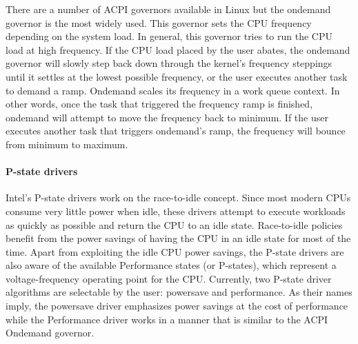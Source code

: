 There are a number of ACPI governors available in Linux but the ondemand governor is the most widely used.
This governor sets the CPU frequency depending on the system load.  
In general, this governor tries to run the CPU load at high frequency. If the CPU load placed by the user abates, the ondemand governor will slowly 
step back down through the kernel's frequency steppings until it settles at the lowest possible frequency, or the user executes another task to demand a ramp.
Ondemand scales its frequency in a work queue context. In other words, once the task that triggered the frequency ramp is finished, 
ondemand will attempt to move the frequency back to minimum. If the user executes another task that triggers ondemand's ramp, the frequency will bounce from minimum to maximum.

\paragraph{P-state drivers}
Intel's P-state drivers work on the race-to-idle concept. Since most modern CPUs consume very little power when idle, these drivers attempt to execute workloads as quickly 
as possible and return the CPU to an idle state. Race-to-idle policies benefit from the power savings of having the CPU in an idle state for most of the time. Apart from 
exploiting the idle CPU power savings, the P-state drivers are also aware of the available Performance states (or P-states), which represent a voltage-frequency operating point for the CPU. 
Currently, two P-state driver algorithms are selectable by the user: powersave and performance. As their names imply, the powersave driver emphasizes power savings at the cost of 
performance while the Performance driver works in a manner that is similar to the ACPI Ondemand governor.
 
